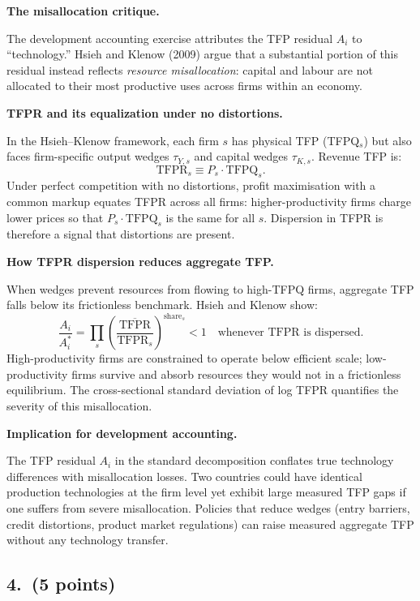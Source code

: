 \documentclass[a4paper,11pt]{article}
\begin{document}
\begin{answerbox}
\textbf{The misallocation critique.}

The development accounting exercise attributes the TFP residual $A_i$ to ``technology.''
Hsieh and Klenow (2009) argue that a substantial portion of this residual instead reflects
\emph{resource misallocation}: capital and labour are not allocated to their most
productive uses across firms within an economy.

\textbf{TFPR and its equalization under no distortions.}

In the Hsieh--Klenow framework, each firm $s$ has physical TFP (TFPQ$_s$) but also faces
firm-specific output wedges $\tau_{Y,s}$ and capital wedges $\tau_{K,s}$. Revenue TFP is:
\[
    \mathrm{TFPR}_s \equiv P_s \cdot \mathrm{TFPQ}_s.
\]
Under perfect competition with no distortions, profit maximisation with a common markup
equates TFPR across all firms: higher-productivity firms charge lower prices so that
$P_s \cdot \mathrm{TFPQ}_s$ is the same for all $s$. Dispersion in TFPR is therefore a
signal that distortions are present.

\textbf{How TFPR dispersion reduces aggregate TFP.}

When wedges prevent resources from flowing to high-TFPQ firms, aggregate TFP falls below
its frictionless benchmark. Hsieh and Klenow show:
\[
    \frac{A_i}{A_i^*} = \prod_s \left(\frac{\overline{\mathrm{TFPR}}}{\mathrm{TFPR}_s}\right)^{\text{share}_s} < 1
    \quad \text{whenever TFPR is dispersed.}
\]
High-productivity firms are constrained to operate below efficient scale; low-productivity
firms survive and absorb resources they would not in a frictionless equilibrium. The
cross-sectional standard deviation of log TFPR quantifies the severity of this
misallocation.

\textbf{Implication for development accounting.}

The TFP residual $A_i$ in the standard decomposition conflates true technology differences
with misallocation losses. Two countries could have identical production technologies at
the firm level yet exhibit large measured TFP gaps if one suffers from severe misallocation.
Policies that reduce wedges (entry barriers, credit distortions, product market regulations)
can raise measured aggregate TFP without any technology transfer.
\end{answerbox}

\subsection*{4.\ (5 points)}
\end{document}
